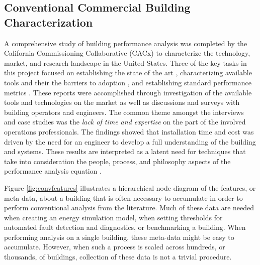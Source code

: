 \subsection{Conventional Commercial Building Characterization}
A comprehensive study of building performance analysis was completed by the California Commissioning Collaborative (CACx) to characterize the technology, market, and research landscape in the United States. Three of the key tasks in this project focused on establishing the state of the art \cite{effinger_building_2010}, characterizing available tools and their the barriers to adoption \cite{ulickey_building_2010}, and establishing standard performance metrics \cite{greensfelder_building_2010}. These reports were accomplished through investigation of the available tools and technologies on the market as well as discussions and surveys with building operators and engineers. The common theme amongst the interviews and case studies was the \emph{lack of time and expertise} on the part of the involved operations professionals. The findings showed that installation time and cost was driven by the need for an engineer to develop a full understanding of the building and systems. These results are interpreted as a latent need for techniques that take into consideration the people, process, and philosophy aspects of the performance analysis equation \cite{miller_applicability_2013}. 

Figure \ref{fig:convfeatures} illustrates a hierarchical node diagram of the features, or meta data, about a building that is often necessary to accumulate in order to perform conventional analysis from the literature. Much of these data are needed when creating an energy simulation model, when setting thresholds for automated fault detection and diagnostics, or benchmarking a building. When performing analysis on a single building, these meta-data might be easy to accumulate. However, when such a process is scaled across hundreds, or thousands, of buildings, collection of these data is not a trivial procedure. 

